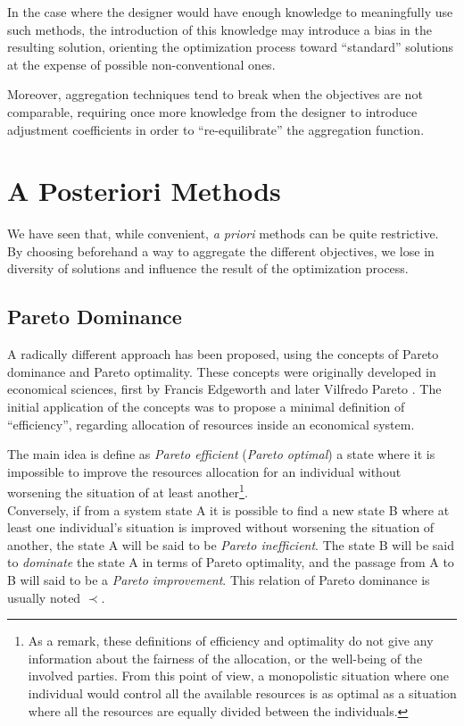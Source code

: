 In the case where the designer would have enough knowledge to meaningfully use such methods, the introduction of this knowledge may introduce a bias in the resulting solution, orienting the optimization process toward \enquote{standard} solutions at the expense of possible non-conventional ones.

Moreover, aggregation techniques tend to break when the objectives are not comparable, requiring once more knowledge from the designer to introduce adjustment coefficients in order to \enquote{re-equilibrate} the aggregation function.

\section{A Posteriori Methods}

We have seen that, while convenient, \emph{a priori} methods can be quite restrictive. By choosing beforehand a way to aggregate the different objectives, we lose in diversity of solutions and influence the result of the optimization process.

\subsection{Pareto Dominance}

A radically different approach has been proposed, using the concepts of Pareto dominance and Pareto optimality. These concepts were originally developed in economical sciences, first by Francis Edgeworth and later Vilfredo Pareto \cite{nla.cat-vn2742363}. The initial application of the concepts was to propose a minimal definition of \enquote{efficiency}, regarding allocation of resources inside an economical system.

The main idea is define as \emph{Pareto efficient} (\emph{Pareto optimal}) a state where it is impossible to improve the resources allocation for an individual without worsening the situation of at least another\footnote{As a remark, these definitions of efficiency and optimality do not give any information about the fairness of the allocation, or the well-being of the involved parties. From this point of view, a monopolistic situation where one individual would control all the available resources is as optimal as a situation where all the resources are equally divided between the individuals.}.\\
Conversely, if from a system state A it is possible to find a new state B where at least one individual's situation is improved without worsening the situation of another, the state A will be said to be \emph{Pareto inefficient}. The state B will be said to \emph{dominate} the state A in terms of Pareto optimality, and the passage from A to B will said to be a \emph{Pareto improvement}. This relation of Pareto dominance is usually noted \(\prec\).


